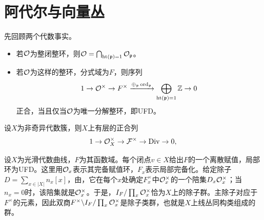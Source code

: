 \section{阿代尔与向量丛}\label{L11S2}
先回顾两个代数事实。
\begin{itemize}
\item 若$\mathcal O$为整闭整环，则$\mathcal O=\bigcap_{\operatorname{ht}(\mathfrak{p})=1}\mathcal O_{\mathfrak{p}}$。
\item 若$\mathcal O$为这样的整环，分式域为$F$，则序列
\[1\to\mathcal O^\times\to F^\times\xrightarrow{\oplus_{\mathfrak{p}}\operatorname{ord}_{\mathfrak{p}}}\bigoplus_{\operatorname{ht}(\mathfrak{p})=1}\mathbb{Z}\to0\]
正合，当且仅当$\mathcal O$为唯一分解整环，即UFD。
\end{itemize}
\begin{proposition}\label{L11S2O1}
设$X$为非奇异代数簇，则$X$上有层的正合列
\[1\to\mathcal O_X^\times\to\mathcal F^\times\to\operatorname{Div}\to0,\]

\end{proposition}
设$X$为光滑代数曲线，$F$为其函数域。每个闭点$v\in X$给出$F$的一个离散赋值，局部环为UFD。这里用$\mathcal O_x$表示其完备赋值环，$F_x$表示局部完备化。给定除子$D=\sum_{x\in|X|}n_x[x]$，由，它在每个$x$处确定$F_x^\times$中$\mathcal O_x^\times$的一个陪集$D_x\mathcal O_x^\times$；当$n_x=0$时，该陪集就是$\mathcal O_x^\times$。于是，$I_F/\prod_x\mathcal O_x^\times$恰为$X$上的除子群。主除子对应于$F^\times$的元素，因此双商$F^\times\backslash I_F/\prod_x\mathcal O_x^\times$是除子类群，也就是$X$上线丛同构类组成的群。

